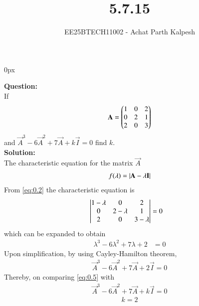 \documentclass[journal]{IEEEtran}
\begin{document}

\title{5.7.15}
\author{EE25BTECH11002 - Achat Parth Kalpesh }
{\let\newpage\relax\maketitle}
\renewcommand{\thefigure}{\theenumi}
\renewcommand{\thetable}{\theenumi}
\setlength{\intextsep}{10pt} %
\renewcommand{\thetable}{\theenumi}
\parindent 0px



\textbf{Question:}\\
If 
\begin{align}
\mathbf{A} = \begin{pmatrix}1 & 0 & 2 \\ 0 & 2 & 1 \\ 2 & 0 & 3\end{pmatrix}
\end{align} 
and $\vec{A}^3-6\vec{A}^2+7\vec{A}+k\vec{I}=0$ find $k$.\\
\textbf{Solution:}\\
The characteristic equation for the matrix $\vec{A}$
\begin{align}
        f(\lambda) = \left\vert\mathbf{A} - \lambda \mathbf{I}\right\vert
        \label{eq:0.2}
\end{align}
From \eqref{eq:0.2} the characteristic equation is
\begin{align}
\begin{vmatrix}1 -\lambda & 0 & 2 \\ 0 & 2 -\lambda & 1 \\ 2 & 0 & 3-\lambda\end{vmatrix} &= 0
\end{align}
which can be expanded to obtain
\begin{align} 
\lambda^3 - 6\lambda^2 + 7\lambda + 2 &= 0 
 \end{align} 
 Upon simplification, by using Cayley-Hamilton theorem,
 \begin{align}
     \vec{A}^3-6\vec{A}^2+7\vec{A}+2\vec{I}=0
     \label{eq:0.5}
 \end{align}
 Thereby, on comparing \eqref{eq:0.5} with
 \begin{align}
     \vec{A}^3-6\vec{A}^2+7\vec{A}+k\vec{I}=0
 \end{align}
 \begin{align}
     k=2
 \end{align}
\end{document}
